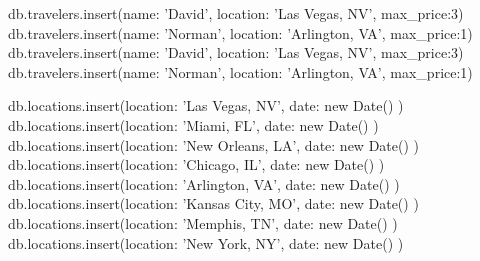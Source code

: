 db.travelers.insert({name: 'David', location: 'Las Vegas, NV',  max_price:3})
db.travelers.insert({name: 'Norman', location: 'Arlington, VA',  max_price:1})
db.travelers.insert({name: 'David', location: 'Las Vegas, NV',  max_price:3})
db.travelers.insert({name: 'Norman', location: 'Arlington, VA',  max_price:1})



db.locations.insert({location: 'Las Vegas, NV', date: new Date()  })
db.locations.insert({location: 'Miami, FL',  date: new Date() })
db.locations.insert({location: 'New Orleans, LA',  date: new Date() })
db.locations.insert({location: 'Chicago, IL',  date: new Date() })
db.locations.insert({location: 'Arlington, VA',  date: new Date() })
db.locations.insert({location: 'Kansas City, MO',  date: new Date() })
db.locations.insert({location: 'Memphis, TN',  date: new Date() })
db.locations.insert({location: 'New York, NY',  date: new Date() })